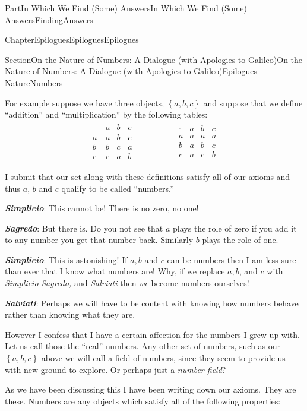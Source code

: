 \documentclass[oneside,10pt,]{book}
\newcommand{\alert}[1]{\textbf{\textit{#1}}}
\numberwithin{equation}{part}
\newcommand{\amp}{&}
\begin{document}
\begin{partptx}{Part}{In Which We Find (Some) Answers}{}{In Which We Find (Some) Answers}{}{}{FindingAnswers}
\begin{chapterptx}{Chapter}{Epilogues}{}{Epilogues}{}{}{Epilogues}
\begin{sectionptx}{Section}{On the Nature of Numbers: A Dialogue (with Apologies to Galileo)}{}{On the Nature of Numbers: A Dialogue (with Apologies to Galileo)}{}{}{Epilogues-NatureNumbers}
\begin{introduction}{}
\par
For example suppose we have three objects, \(\left\{a, b, c\right\}\) and suppose that we define ``addition'' and ``multiplication'' by the following tables:%
\begin{align*}
\begin{array}{c|ccc} 
+\amp a\amp b\amp c\\\hline 
a\amp a\amp b\amp c\\
b\amp b\amp c\amp a\\ 
c\amp c\amp a\amp b 
\end{array}  
\amp \amp \amp \amp \amp \amp 
\begin{array}{c|ccc} 
\cdot\amp a\amp b\amp c\\\hline 
a\amp a\amp a\amp a\\ 
b\amp a\amp b\amp c\\ 
c\amp a\amp c\amp b 
\end{array} 
\end{align*}
%
\par
I submit that our set along with these definitions satisfy all of our axioms and thus \(a\), \(b\) and \(c\) qualify to be called ``numbers.''%
\par
\alert{Simplicio}:  This cannot be! There is no zero, no one!%
\par
\alert{Sagredo}:  But there is. Do you not see that \(a\) plays the role of zero \textemdash{} if you add it to any number you get that number back. Similarly \(b\) plays the role of one.%
\par
\alert{Simplicio}: This is astonishing! If \(a, b\) and \(c\) can be numbers then I am less sure than ever that I know what numbers are! Why, if we replace \(a, b\), and \(c\) with \emph{Simplicio} \emph{Sagredo,} and \emph{Salviati} then \emph{we} become numbers ourselves!%
\par
\alert{Salviati}:  Perhaps we will have to be content with knowing how numbers behave rather than knowing what they are.%
\par
However I confess that I have a certain affection for the numbers I grew up with. Let us call those the ``real'' numbers. Any other set of numbers, such as our \(\left\{a,b,c\right\}\) above we will call a field of numbers, since they seem to provide us with new ground to explore. Or perhaps just a \emph{number field}?%
\par
As we have been discussing this I have been writing down our axioms.  They are these.  Numbers are any objects which satisfy all of the following properties:%

\end{introduction}
\end{sectionptx}
\end{chapterptx}
\end{partptx}
\end{document}
